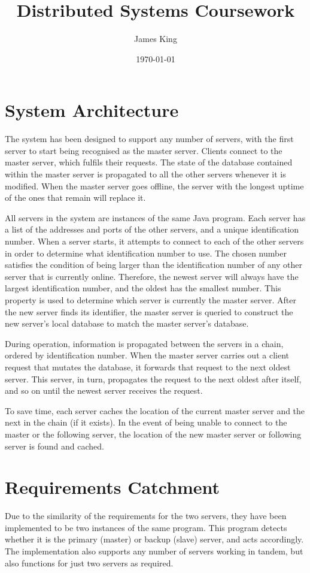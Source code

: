 \documentclass[a4paper,11pt]{article}
\title{Distributed Systems Coursework}
\date{\today}
\author{James King}
\begin{document}
\maketitle

\section{System Architecture}
The system has been designed to support any number of servers, with the first server to start being recognised as the master server. Clients connect to the master server, which fulfils their requests. The state of the database contained within the master server is propagated to all the other servers whenever it is modified. When the master server goes offline, the server with the longest uptime of the ones that remain will replace it.

All servers in the system are instances of the same Java program. Each server has a list of the addresses and ports of the other servers, and a unique identification number. When a server starts, it attempts to connect to each of the other servers in order to determine what identification number to use. The chosen number satisfies the condition of being larger than the identification number of any other server that is currently online. Therefore, the newest server will always have the largest identification number, and the oldest has the smallest number. This property is used to determine which server is currently the master server. After the new server finds its identifier, the master server is queried to construct the new server's local database to match the master server's database.

During operation, information is propagated between the servers in a chain, ordered by identification number. When the master server carries out a client request that mutates the database, it forwards that request to the next oldest server. This server, in turn, propagates the request to the next oldest after itself, and so on until the newest server receives the request.

To save time, each server caches the location of the current master server and the next in the chain (if it exists). In the event of being unable to connect to the master or the following server, the location of the new master server or following server is found and cached.

\section{Requirements Catchment}
Due to the similarity of the requirements for the two servers, they have been implemented to be two instances of the same program. This program detects whether it is the primary (master) or backup (slave) server, and acts accordingly. The implementation also supports any number of servers working in tandem, but also functions for just two servers as required.
\end{document}
